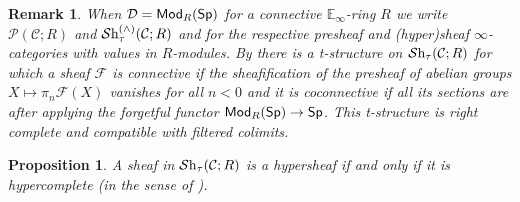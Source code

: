 \documentclass[reqno]{amsart}
\numberwithin{equation}{section}\theoremstyle{thms}
\newtheorem{prop}[equation]{Proposition}
\theoremstyle{defn}
\newtheorem{rem}[equation]{Remark}
\newcommand{\bE}{\mathbb{E}}
\newcommand{\cC}{\mathcal{C}}
\newcommand{\cD}{\mathcal{D}}
\newcommand{\cF}{\mathcal{F}}
\newcommand{\cP}{\mathcal{P}}
\newcommand{\tn}[1]{\textnormal{#1}}
\newcommand{\tsf}[1]{\textsf{\textup{#1}}}
\newcommand{\mcal}[1]{\mathcal{#1}}
\newcommand{\sheaves}{\mcal{S}\tn{h}}
\newcommand{\Mod}{\tsf{Mod}}
\newcommand{\spec}{\tsf{Sp}}
\begin{document}
\begin{rem}\label{rem:tstructureonsheaves}
When $\cD = \Mod_R(\spec)$ for a connective $\bE_{\infty}$-ring $R$ we write $\cP(\cC;R)$ and $\sheaves_{\tau}^{(\wedge)}(\cC; R)$ and for the respective presheaf and (hyper)sheaf $\infty$-categories with values in $R$-modules. By \cite[Proposition 1.3.2.7, 2.1.1.1]{lur18} there is a t-structure on $\sheaves_{\tau}(\cC; R)$ for which a sheaf $\cF$ is connective if the sheafification of the presheaf of abelian groups $X \mapsto \pi_n\cF(X)$ vanishes for all $n<0$ and it is coconnective if all its sections are after applying the forgetful functor $\Mod_R(\spec) \to \spec$. This t-structure is right complete and compatible with filtered colimits.
\end{rem}

\begin{prop}\label{prop:hypersheafhypercomplete}
A sheaf in $\sheaves_{\tau}(\cC; R)$ is a hypersheaf if and only if it is hypercomplete (in the sense of ).
\end{prop}
\end{document}
